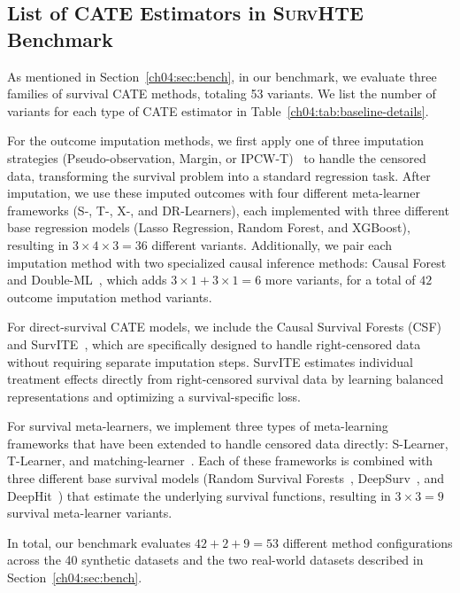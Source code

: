 \subsection{List of CATE Estimators in \textsc{SurvHTE} Benchmark} \label{ch04:app:exp-setup}


As mentioned in Section~\ref{ch04:sec:bench}, in our benchmark, we evaluate three families of survival CATE methods, totaling 53 variants.
We list the number of variants for each type of CATE estimator in Table~\ref{ch04:tab:baseline-details}.

For the outcome imputation methods, we first apply one of three imputation strategies (Pseudo-observation, Margin, or IPCW-T)~\citep{qi2023an} to handle the censored data, transforming the survival problem into a standard regression task.
After imputation, we use these imputed outcomes with four different meta-learner frameworks (S-, T-, X-, and DR-Learners), each implemented with three different base regression models (Lasso Regression, Random Forest, and XGBoost), resulting in $3 \times 4 \times 3 = 36$
different variants.
Additionally, we pair each imputation method with two specialized causal inference methods: Causal Forest~\citep{athey2019grf} and Double-ML~\citep{chernozhukov2018double}, which adds $3 \times 1 + 3 \times 1 = 6$ more variants, for a total of $42$ outcome imputation method variants.

For direct-survival CATE models, we include the Causal Survival Forests (CSF)~\citep{ch04:cui2023estimating} and SurvITE~\citep{curth2021survite}, which are specifically designed to handle right-censored data without requiring separate imputation steps.
SurvITE estimates individual treatment effects directly from right-censored survival data by learning balanced representations and optimizing a survival-specific loss.

For survival meta-learners, we implement three types of meta-learning frameworks that have been extended to handle censored data directly: S-Learner, T-Learner, and matching-learner~\citep{noroozizadeh2025impact}.
Each of these frameworks is combined with three different base survival models (Random Survival Forests~\citep{ch04:ishwaran2008random}, DeepSurv~\citep{ch04:katzman2018deepsurv}, and DeepHit~\citep{ch04:lee2018deephit}) that estimate the underlying survival functions, resulting in $3 \times 3 = 9$ survival meta-learner variants.

In total, our benchmark evaluates $42+2+9=53$ different method configurations across the 40 synthetic datasets and the two real-world datasets described in Section~\ref{ch04:sec:bench}.









